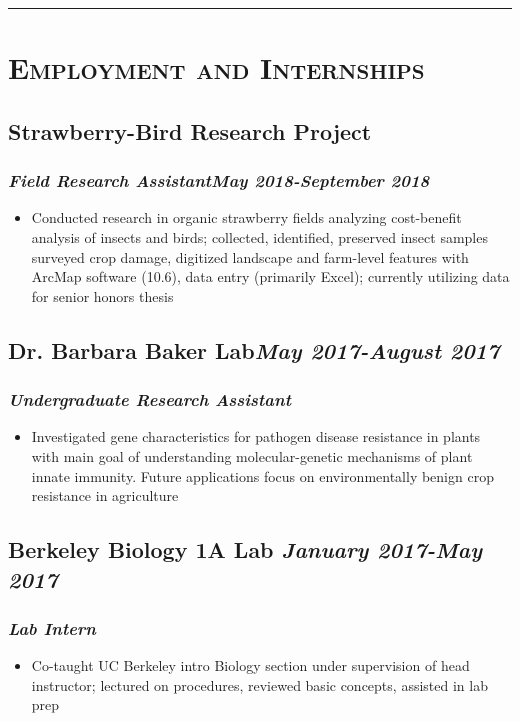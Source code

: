 \documentclass{article}
\begin{document}
\noindent\rule{19cm}{0.4pt}

\section*{\textsc{Employment and Internships}}
\subsection*{Strawberry-Bird Research Project}
\subsubsection*{\textit{Field Research Assistant}\hfill \textit{\small May 2018-September 2018}}
\begin{itemize}
    \item {Conducted research in organic strawberry fields analyzing cost-benefit analysis of insects and birds; collected, identified, preserved insect samples surveyed crop damage, digitized landscape and farm-level features with ArcMap software (10.6), data entry (primarily Excel); currently utilizing data for senior honors thesis}
\end{itemize}
\subsection*{\bf{Dr. Barbara Baker Lab}\hfill\textit{\small May 2017-August 2017}}
\subsubsection*{\textit{Undergraduate Research Assistant}}
\begin{itemize}
    \item {Investigated gene characteristics for pathogen disease resistance in plants with main goal of understanding molecular-genetic mechanisms of plant innate immunity. Future applications focus on environmentally benign crop resistance in agriculture}
\end{itemize}

\subsection*{\bf{Berkeley Biology 1A Lab} \hfill \textit{\small January 2017-May 2017}}
\subsubsection*{\textit{Lab Intern}}
\begin{itemize}
    \item {Co-taught UC Berkeley intro Biology section under supervision of head instructor; lectured on procedures, reviewed basic concepts, assisted in lab prep}
\end{itemize}
\end{document}
